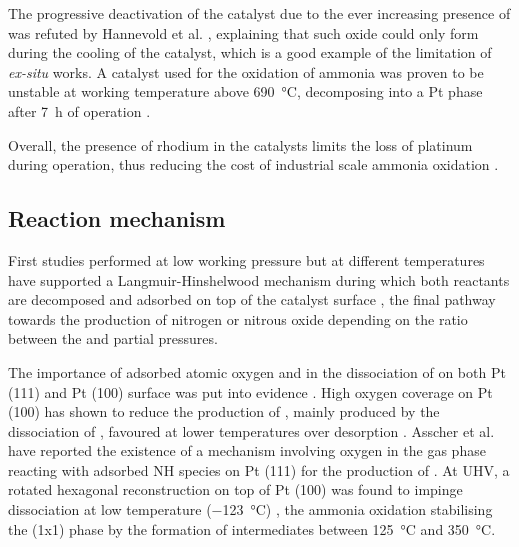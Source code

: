 The progressive deactivation of the catalyst due to the ever increasing presence of  \parencite{McCabe1986} was refuted by Hannevold et al. \parencite*{Hannevold2005}, explaining that such oxide could only form during the cooling of the catalyst, which is a good example of the limitation of \textit{ex-situ} works.
A  catalyst used for the oxidation of ammonia was proven to be unstable at working temperature above \qty{690}{\degreeCelsius}, decomposing into a Pt phase after \qty{7}{\hour} of operation \parencite{Zakharchenko2001}.

Overall, the presence of rhodium in the catalysts limits the loss of platinum during operation, thus reducing the cost of industrial scale ammonia oxidation \parencite{Hatscher2008}.

\subsection{Reaction mechanism}

First studies performed at low working pressure but at different temperatures have supported a Langmuir-Hinshelwood mechanism during which both reactants are decomposed and adsorbed on top of the catalyst surface \parencite{Nutt1969, Pignet1974, Ostermaier1974, Pignet1975, Gland1978a}, the final pathway towards the production of nitrogen or nitrous oxide depending on the ratio between the  and  partial pressures.

The importance of adsorbed atomic oxygen and  in the dissociation of  on both Pt (111) \parencite{Mieher1995} and Pt (100) surface was put into evidence \parencite{Bradley1995, Bradley1997, vandenBroek1999, Kim2000}.
High oxygen coverage on Pt (100) has shown to reduce the production of , mainly produced by the dissociation of , favoured at lower temperatures over  desorption \parencite{Bradley1995}.
Asscher et al. \parencite*{Asscher1984} have reported the existence of a mechanism involving oxygen in the gas phase reacting with adsorbed NH species on Pt (111) for the production of .
At UHV, a rotated hexagonal reconstruction on top of Pt (100) was found to impinge  dissociation at low temperature (\qty{-123}{\degreeCelsius}) \parencite{Bradley1997}, the ammonia oxidation stabilising the (1x1) phase \parencite{Rafti2007} by the formation of  intermediates between \qty{125}{\degreeCelsius} and \qty{350}{\degreeCelsius}.

